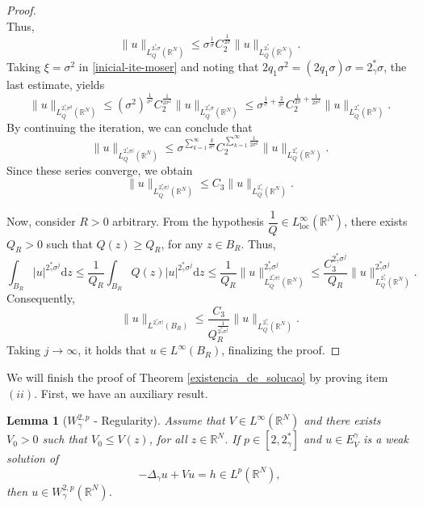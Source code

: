 \documentclass[12pt]{amsart}
\newtheorem{lemma}[theorem]{Lemma}
\newcommand{\R}{\mathbb{R}}
\begin{document}
\begin{proof}
$$	$$
Thus,
	$$
\|u\|_{L^{2_\gamma^*\sigma}_Q(\mathbb{R}^N)} \leq \sigma^{\frac{1}{\sigma}} C_2^{\frac{1}{2\sigma}}\|u\|_{L^{2_\gamma^*}_Q(\mathbb{R}^N)}.
	$$
    Taking $\xi=\sigma^2$ in \eqref{inicial-ite-moser} and noting that $2q_1\sigma^2=(2q_1\sigma)\sigma = 2_\gamma^*\sigma$, the last estimate, yields
	$$
	\|u\|_{L^{2_\gamma^*\sigma^2}_Q(\mathbb{R}^N)} \leq (\sigma^2)^{\frac{1}{\sigma^2}} C_2^{\frac{1}{2\sigma^2}}\|u\|_{L^{2_\gamma^*\sigma}_Q(\mathbb{R}^N)} \leq \sigma^{\frac{1}{\sigma}+\frac{2}{\sigma^2}}C_2^{\frac{1}{2\sigma} + \frac{1}{2\sigma^2}}\|u\|_{L^{2_\gamma^*}_Q(\mathbb{R}^N)}.
	$$
By continuing the iteration, we can conclude that
	$$
	\|u\|_{L^{2_\gamma^*\sigma^j}_Q(\mathbb{R}^N)} \leq \sigma^{\sum_{k=1}^\infty \frac{k}{\sigma^k}} C_2^{\sum_{k=1}^\infty \frac{1}{2\sigma^k}}\|u\|_{L_Q^{2_\gamma^*}(\mathbb{R}^N)}.
	$$
Since these series converge, we obtain
	$$
	\|u\|_{L^{2_\gamma^*\sigma^j}_Q(\mathbb{R}^N)} \leq C_3\|u\|_{L_Q^{2_\gamma^*}(\mathbb{R}^N)}.
	$$


    Now, consider $R>0$ arbitrary. From the hypothesis $\dfrac{1}{Q} \in L^\infty_{\mathrm{loc}}(\R^N)$, there exists $Q_R>0$ such that $Q(z) \geq Q_R$, for any $z \in B_R$. Thus,
	$$
	\int_{B_R}|u|^{2_\gamma^*\sigma^j} \mathrm{d}z \leq \frac{1}{Q_R}\int_{B_R}Q(z)|u|^{2_\gamma^*\sigma^j} \mathrm{d}z \leq \frac{1}{Q_R}\|u\|_{L^{2_\gamma^*\sigma^j}_Q(\mathbb{R}^N)}^{2_\gamma^*\sigma^j} \leq \frac{C_3^{2_\gamma^*\sigma^j}}{Q_R}\|u\|_{L^{2_\gamma^*}_Q(\mathbb{R}^N)}^{2_\gamma^*\sigma^j}.
	$$
Consequently,
	$$
	\|u\|_{L^{2_\gamma^*\sigma^j}(B_R)} \leq \frac{C_3}{Q_R^{\frac{1}{2_\gamma^*\sigma^j}}}\|u\|_{L_Q^{2_\gamma^*}(\mathbb{R}^N)}.
	$$
Taking $j \to \infty$, it holds that $u \in L^\infty(B_R)$, finalizing the proof.
\end{proof}
    


We will finish the proof of Theorem \ref{existencia_de_solucao} by proving item $(ii)$. First, we have an auxiliary result.

  	



\begin{lemma}[$W_\gamma^{2, p}$ - Regularity]\label{wreg}
	Assume that $V \in L^{\infty}(\R^N)$ and there exists $V_0>0$ such that $V_0\leq V(z)$, for all $z\in\R^N$. If $p\in[2,2_\gamma^*]$ and $u\in E_V^\gamma$ is a weak solution of
    \begin{equation}\label{linearSG}
		-\Delta_\gamma u +V u = h \in L^p(\R^N),
	\end{equation}
	then $u \in W_\gamma^{2, p}\left(\mathbb{R}^N\right)$.
\end{lemma}
\end{document}
